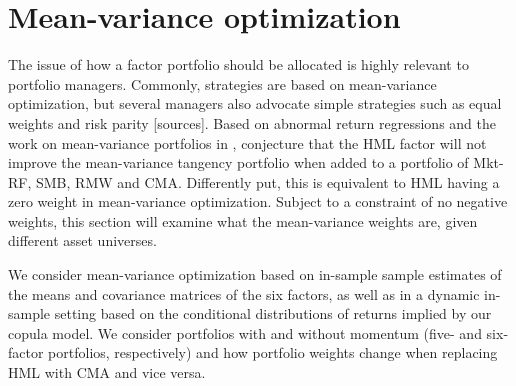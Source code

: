 
\section{Mean-variance optimization}
\label{sec:mean_variance}

The issue of how a factor portfolio should be allocated is highly relevant to portfolio managers. Commonly, strategies are based on mean-variance optimization, but several managers also advocate simple strategies such as equal weights and risk parity [sources]. Based on abnormal return regressions and the work on mean-variance portfolios in \textcite{HubermanKandel1987}, \textcite{FF2015} conjecture that the HML factor will not improve the mean-variance tangency portfolio when added to a portfolio of Mkt-RF, SMB, RMW and CMA. Differently put, this is equivalent to HML having a zero weight in mean-variance optimization. Subject to a constraint of no negative weights, this section will examine what the mean-variance weights are, given different asset universes.

We consider mean-variance optimization based on in-sample sample estimates of the means and covariance matrices of the six factors, as well as in a dynamic in-sample setting based on the conditional distributions of returns implied by our copula model. We consider portfolios with and without momentum (five- and six-factor portfolios, respectively) and how portfolio weights change when replacing HML with CMA and vice versa.




